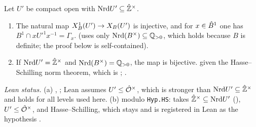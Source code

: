 \begin{lemma}\label{lem:s02-normone}
Let $U'$ be compact open with $\mathrm{Nrd} U'\subseteq\hat{\mathbb{Z}}^\times$.
\begin{enumerate}[label=(\alph*)]
\item The natural map $X^1_B(U')\to X_B(U')$ is injective, and for $x\in\hat{B}^1$ one has
  $B^1\cap xU'^1x^{-1}=\Gamma_x$.\quad\stproved{} (uses only $\mathrm{Nrd}(B^\times)\subseteq\mathbb{Q}_{>0}$, which holds
  because $B$ is definite; the proof below is self-contained).
\item If $\mathrm{Nrd} U'=\hat{\mathbb{Z}}^\times$ and $\mathrm{Nrd}(B^\times)=\mathbb{Q}_{>0}$, the map is bijective.\quad\stproved{} given
  the Hasse--Schilling norm theorem, which is \stcited{}
  ;
  .
\end{enumerate}
\begin{sloppypar}\noindent\emph{Lean status.} (a) \stformal{} ,
; Lean assumes $U'\le\hat{\mathcal{O}}^\times$, which is stronger than $\mathrm{Nrd} U'\subseteq\hat{\mathbb{Z}}^\times$
and holds for all levels used here. (b) \stformal{} modulo \texttt{Hyp.HS}:  takes
$\hat{\mathbb{Z}}^\times\subseteq\mathrm{Nrd} U'$ (), $U'\le\hat{\mathcal{O}}^\times$, and Hasse--Schilling, which stays \stcited{} and is
registered in Lean as the hypothesis .\end{sloppypar}
\end{lemma}
